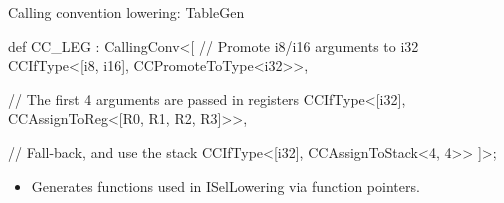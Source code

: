 
\begin{frame}[fragile]{Calling convention lowering: TableGen}

\begin{codebox}
def CC_LEG : CallingConv<[
    // Promote i8/i16 arguments to i32
    CCIfType<[i8, i16], CCPromoteToType<i32>>,

    // The first 4 arguments are passed in registers
    CCIfType<[i32], CCAssignToReg<[R0, R1, R2, R3]>>,

    // Fall-back, and use the stack
    CCIfType<[i32], CCAssignToStack<4, 4>>
  ]>;
\end{codebox}

\begin{itemize}
    \item Generates functions used in ISelLowering via function pointers.
\end{itemize}

\end{frame}


